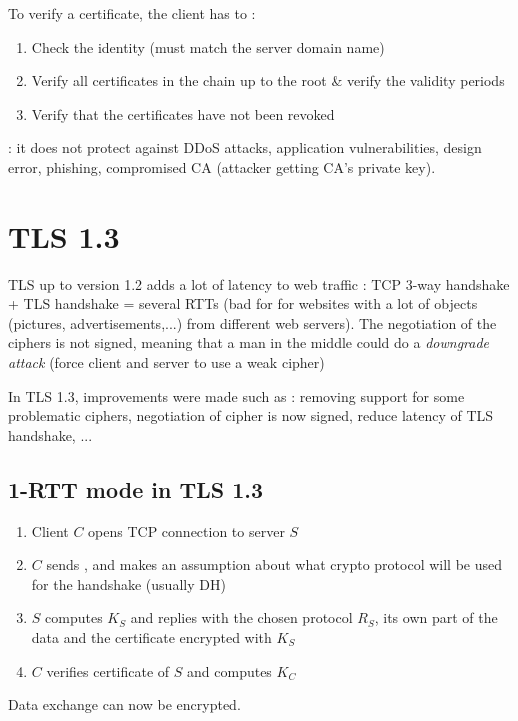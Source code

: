 To verify a certificate, the client has to :
\begin{enumerate}
    \item Check the identity (must match the server domain name)
    \item Verify all certificates in the chain up to the root \& verify the validity periods
    \item Verify that the certificates have not been revoked
\end{enumerate}

 : it does not protect against DDoS attacks, application vulnerabilities, design error, phishing, compromised CA (attacker getting CA's private key).

\section{TLS 1.3}

TLS up to version 1.2 adds a lot of latency to web traffic : TCP 3-way handshake + TLS handshake = several RTTs (bad for for websites with a lot of objects (pictures, advertisements,...) from different web servers). The negotiation of the ciphers is not signed, meaning that a man in the middle could do a \textit{downgrade attack} (force client and server to use a weak cipher)

In TLS 1.3, improvements were made such as : removing support for some problematic ciphers, negotiation of cipher is now signed, reduce latency of TLS handshake, ...

\subsection{1-RTT mode in TLS 1.3}

\begin{enumerate}
    \item Client $C$ opens TCP connection to server $S$
    \item $C$ sends , and makes an assumption about what crypto protocol will be used for the handshake (usually DH)
    \item $S$ computes $K_S$ and replies with the chosen protocol $R_S$, its own part of the data and the certificate encrypted with $K_S$
    \item $C$ verifies certificate of $S$ and computes $K_C$
\end{enumerate}

Data exchange can now be encrypted.

